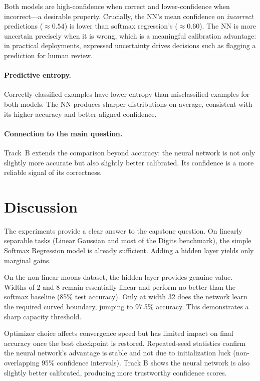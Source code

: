 \documentclass[11pt]{article}
\begin{document}
Both models are high-confidence when correct and lower-confidence when
incorrect---a desirable property.
Crucially, the NN's mean confidence on \emph{incorrect} predictions
($\approx0.54$) is lower than softmax regression's ($\approx0.60$).
The NN is more uncertain precisely when it is wrong, which is a meaningful
calibration advantage: in practical deployments, expressed uncertainty drives
decisions such as flagging a prediction for human review.

\paragraph{Predictive entropy.}
Correctly classified examples have lower entropy than misclassified examples
for both models.
The NN produces sharper distributions on average, consistent with its higher
accuracy and better-aligned confidence.

\paragraph{Connection to the main question.}
Track~B extends the comparison beyond accuracy: the neural network is not only
slightly more accurate but also slightly better calibrated.
Its confidence is a more reliable signal of its correctness.

\section{Discussion}
\label{sec:discussion}

The experiments provide a clear answer to the capstone question. On linearly separable tasks (Linear Gaussian and most of the Digits benchmark), the simple Softmax Regression model is already sufficient. Adding a hidden layer yields only marginal gains.

On the non-linear moons dataset, the hidden layer provides genuine value. Widths of 2 and 8 remain essentially linear and perform no better than the softmax baseline (85\% test accuracy). Only at width 32 does the network learn the required curved boundary, jumping to 97.5\% accuracy. This demonstrates a sharp capacity threshold.

Optimizer choice affects convergence speed but has limited impact on final accuracy once the best checkpoint is restored. Repeated-seed statistics confirm the neural network’s advantage is stable and not due to initialization luck (non-overlapping 95\% confidence intervals). Track B shows the neural network is also slightly better calibrated, producing more trustworthy confidence scores.
\end{document}
